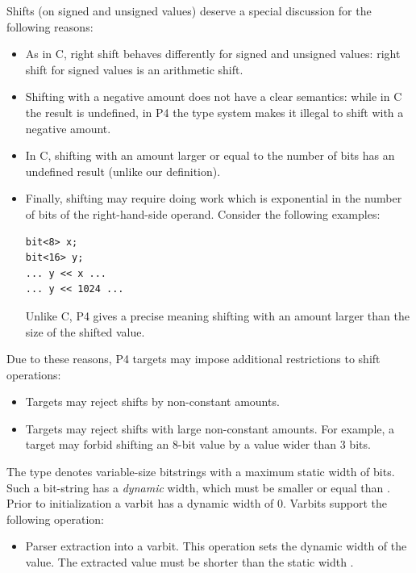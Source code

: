 \documentclass[12pt]{article}
\begin{document}

Shifts (on signed and unsigned values) deserve a special discussion for
the following reasons:

\begin{itemize}
  \item As in C, right shift behaves differently for signed and
    unsigned values: right shift for signed values is an arithmetic
    shift.
  \item Shifting with a negative amount does not have a clear
    semantics: while in C the result is undefined, in P4 the type
    system makes it illegal to shift with a negative amount.
  \item In C, shifting with an amount larger or equal to the number of
    bits has an undefined result (unlike our definition).
  \item Finally, shifting may require doing work which is exponential
    in the number of bits of the right-hand-side operand.  Consider
    the following examples:

\begin{lstlisting}[style=P4style]
bit<8> x;
bit<16> y;
... y << x ...
... y << 1024 ...
\end{lstlisting}

    Unlike C, P4 gives a precise meaning shifting with an amount
    larger than the size of the shifted value.
\end{itemize}

Due to these reasons, P4 targets may impose additional restrictions to
shift operations:

\begin{itemize}
\item Targets may reject shifts by non-constant amounts.
\item Targets may reject shifts with large non-constant amounts.  For
  example, a target may forbid shifting an 8-bit value by a value
  wider than 3 bits.
\end{itemize}


The type  denotes variable-size bitstrings
with a maximum static width of \W{} bits.  Such a bit-string has a
\emph{dynamic} width, which must be smaller or equal than \W.  Prior
to initialization a varbit has a dynamic width of 0.  Varbits support
the following operation:

\begin{itemize}
\item Parser extraction into a varbit. This operation sets the dynamic
  width of the value.  The extracted value must be shorter than the
  static width \W.
\end{itemize}
\end{document}
